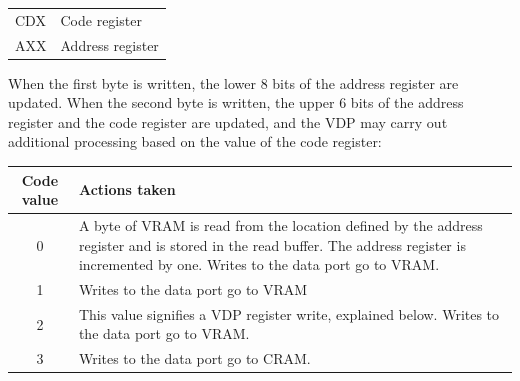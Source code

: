 \documentclass{article}
\begin{document}

\begin{table}[H]
    \centering
    \begin{tabular}{l|l}
        \hline
        \hline
        CDX & Code register     \\ 
        AXX & Address register  \\
    \end{tabular}
\end{table}

When the first byte is written, the lower 8 bits of the address register are
updated. When the second byte is written, the upper 6 bits of the address
register and the code register are updated, and the VDP may carry out
additional processing based on the value of the code register:

\begin{table}[H]
    \centering
    \begin{tabular}{c|p{5in}}
        Code value      & Actions taken                                                 \\ 
        \hline
        \hline
            0           & A byte of VRAM is read from the location defined by           
                        the address register and is stored in the read buffer.        
                        The address register is incremented by one. Writes to         
                        the data port go to VRAM.                                     \\ 
            1           & Writes to the data port go to VRAM                            \\
            2           & This value signifies a VDP register write, explained below.   
                          Writes to the data port go to VRAM.                           \\
            3           & Writes to the data port go to CRAM.                           \\
    \end{tabular}
\end{table}
\end{document}
